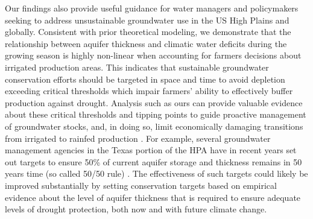 \documentclass[
]{article}
\begin{document}
Our findings also provide useful guidance for water managers and policymakers seeking to address unsustainable groundwater use in the US High Plains and globally. Consistent with prior theoretical modeling, we demonstrate that the relationship between aquifer thickness and climatic water deficits during the growing season is highly non-linear when accounting for farmers decisions about irrigated production areas. This indicates that sustainable groundwater conservation efforts \citep{macewan2017hydroecon, butler2020charting, elshall2020groundwater} should be targeted in space and time to avoid depletion exceeding critical thresholds which impair farmers' ability to effectively buffer production against drought. Analysis such as ours can provide valuable evidence about these critical thresholds and tipping points to guide proactive management of groundwater stocks, and, in doing so, limit economically damaging transitions from irrigated to rainfed production \citep{foster2017effects, deines2020transitions}. For example, several groundwater management agencies in the Texas portion of the HPA have in recent years set out targets to ensure 50\% of current aquifer storage and thickness remains in 50 years time (so called 50/50 rule) \citep{closas2018chronicle}. The effectiveness of such targets could likely be improved substantially by setting conservation targets based on empirical evidence about the level of aquifer thickness that is required to ensure adequate levels of drought protection, both now and with future climate change.
\end{document}
